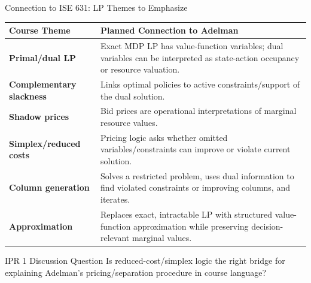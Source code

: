 \documentclass[aspectratio=169,11pt]{beamer}
\begin{document}
\begin{frame}[t]{Connection to ISE 631: LP Themes to Emphasize}
\small
\begin{tabularx}{\textwidth}{>{\bfseries}p{} X}
\toprule
Course Theme & Planned Connection to Adelman \\
\midrule
Primal/dual LP & Exact MDP LP has value-function variables; dual variables can be interpreted as state-action occupancy or resource valuation. \\
\addlinespace
Complementary slackness & Links optimal policies to active constraints/support of the dual solution. \\
\addlinespace
Shadow prices & Bid prices are operational interpretations of marginal resource values. \\
\addlinespace
Simplex/reduced costs & Pricing logic asks whether omitted variables/constraints can improve or violate current solution. \\
\addlinespace
Column generation & Solves a restricted problem, uses dual information to find violated constraints or improving columns, and iterates. \\
\addlinespace
Approximation & Replaces exact, intractable LP with structured value-function approximation while preserving decision-relevant marginal values. \\
\bottomrule
\end{tabularx}

\vspace{0.4em}
\begin{block}{IPR 1 Discussion Question}
Is reduced-cost/simplex logic the right bridge for explaining Adelman's pricing/separation procedure in course language?
\end{block}
\end{frame}
\end{document}
